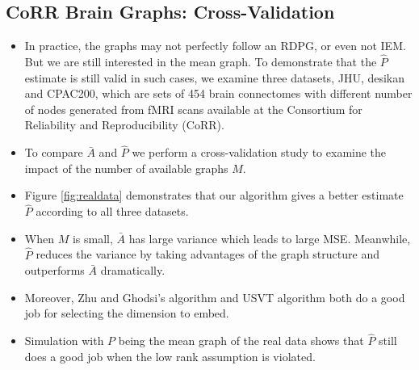 \documentclass[a4paper]{article}
\begin{document}
\subsection{CoRR Brain Graphs: Cross-Validation}
\begin{itemize}
\item In practice, the graphs may not perfectly follow an RDPG, or even not IEM. But we are still interested in the mean graph. To demonstrate that the $\hat{P}$ estimate is still valid in such cases, we examine three datasets, JHU, desikan and CPAC200, which are sets of 454 brain connectomes with different number of nodes generated from fMRI scans available at the Consortium for Reliability and Reproducibility (CoRR).
\item To compare $\bar{A}$ and $\hat{P}$ we perform a cross-validation study to examine the impact of the number of available graphs $M$.
\item Figure \ref{fig:realdata} demonstrates that our algorithm gives a better estimate $\hat{P}$ according to all three datasets. 
\item When $M$ is small, $\bar{A}$ has large variance which leads to large MSE. Meanwhile, $\hat{P}$ reduces the variance by taking advantages of the graph structure and outperforms $\bar{A}$ dramatically.
\item Moreover, Zhu and Ghodsi's algorithm and USVT algorithm both do a good job for selecting the dimension to embed.
\item Simulation with $P$ being the mean graph of the real data shows that $\hat{P}$ still does a good job when the low rank assumption is violated.
\end{itemize}
\end{document}
